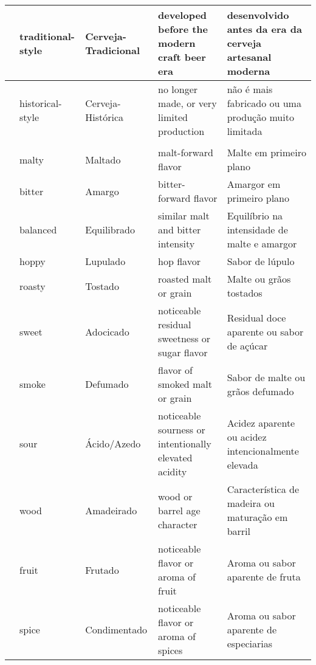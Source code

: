 \begin{longtable}{ | p{32mm} | p{32mm} | p{32mm} | p{32mm} | p{32mm} | }
\hline
& traditional-style & Cerveja-Tradicional & developed before the modern craft beer era & desenvolvido antes da era da cerveja artesanal moderna \\
\hline
& historical-style & Cerveja-Histórica & no longer made, or very limited production & não é mais fabricado ou uma produção muito limitada \\
\hline
\rowcolor{darkgray}
\multicolumn{5}{|l|}{\color{white}\textbf{Dominant Flavor (Sabor Dominante)}} \\
\hline
& malty & Maltado & malt-forward flavor & Malte em primeiro plano \\
\hline
& bitter & Amargo & bitter-forward flavor & Amargor em primeiro plano \\
\hline
& balanced & Equilibrado & similar malt and bitter intensity & Equilíbrio na intensidade de malte e amargor \\
\hline
& hoppy & Lupulado & hop flavor & Sabor de lúpulo \\
\hline
& roasty & Tostado & roasted malt or grain & Malte ou grãos tostados \\
\hline
& sweet & Adocicado & noticeable residual sweetness or sugar flavor & Residual doce aparente ou sabor de açúcar \\
\hline
& smoke & Defumado & flavor of smoked malt or grain & Sabor de malte ou grãos defumado \\
\hline
& sour & Ácido/Azedo & noticeable sourness or intentionally elevated acidity & Acidez aparente ou acidez intencionalmente elevada \\
\hline
& wood & Amadeirado & wood or barrel age character & Característica de madeira ou maturação em barril \\
\hline
& fruit & Frutado & noticeable flavor or aroma of fruit & Aroma ou sabor aparente de fruta \\
\hline
& spice & Condimentado & noticeable flavor or aroma of spices & Aroma ou sabor aparente de especiarias \\
\hline
\end{longtable}